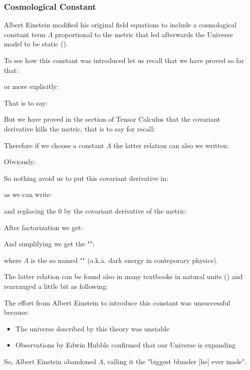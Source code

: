 	\pagebreak
	\subsubsection{Cosmological Constant}
	Albert Einstein modified his original field equations to include a cosmological constant term $\Lambda$ proportional to the metric that led afterwards the Universe model to be static ().
	
	To see how this constant was introduced let us recall that we have proved so far that:
	
	or more explicitly:
	
	That is to say:
	
	But we have proved in the section of Tensor Calculus that the covariant derivative kills the metric, that is to say for recall:
	
	Therefore if we choose a constant $\Lambda$ the latter relation can also we written:
	
	Obviously:
	
	So nothing avoid us to put this covariant derivative in:
	
	as we can write:
	
	and replacing the $0$ by the covariant derivative of the metric:
	
	After factorization we get:
	
	And simplifying we get the "":
	
	where $\Lambda$ is the so named "" (a.k.a. dark energy in conteporary physics).
	
	The latter relation can be found also in many textbooks in natural units () and rearranged a little bit as following:
	
	The effort from Albert Einstein to introduce this constant was unsuccessful because:
	\begin{itemize}
		\item The universe described by this theory was unstable
		\item Observations by Edwin Hubble confirmed that our Universe is expanding
	\end{itemize}
	So, Albert Einstein abandoned $\Lambda$, calling it the "biggest blunder [he] ever made".

